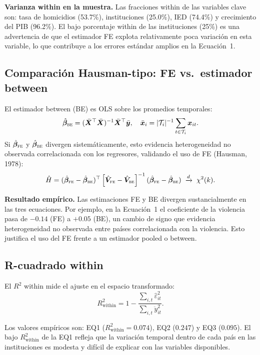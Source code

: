 \documentclass[12pt, a4paper]{article}
\theoremstyle{definition}
\begin{document}
\begin{resultbox}
\textbf{Varianza within en la muestra.} Las fracciones within de las variables clave son: tasa de homicidios (53.7\%), instituciones (25.0\%), IED (74.4\%) y crecimiento del PIB (96.2\%). El bajo porcentaje within de las instituciones (25\%) es una advertencia de que el estimador FE explota relativamente poca variación en esta variable, lo que contribuye a los errores estándar amplios en la Ecuación~1.
\end{resultbox}

\subsection{Comparación Hausman-tipo: FE vs.\ estimador between}

El estimador between (BE) es OLS sobre los promedios temporales:
\[
  \hat{\bm{\beta}}_{\textsc{be}} = (\bar{\bm{X}}^\top\bar{\bm{X}})^{-1}\bar{\bm{X}}^\top\bar{\bm{y}},
  \quad \bar{\bm{x}}_i = |\mathcal{T}_i|^{-1}\sum_{t\in\mathcal{T}_i}\bm{x}_{it}.
\]
Si $\hat{\bm{\beta}}_{\textsc{fe}}$ y $\hat{\bm{\beta}}_{\textsc{be}}$ divergen sistemáticamente, esto evidencia heterogeneidad no observada correlacionada con los regresores, validando el uso de FE (Hausman, 1978):
\[
  \hat{H} = (\hat{\bm{\beta}}_{\textsc{fe}} - \hat{\bm{\beta}}_{\textsc{be}})^\top
            \left[\hat{\bm{V}}_{\textsc{fe}} - \hat{\bm{V}}_{\textsc{be}}\right]^{-1}
            (\hat{\bm{\beta}}_{\textsc{fe}} - \hat{\bm{\beta}}_{\textsc{be}})
  \;\xrightarrow{d}\; \chi^2(k).
\]

\begin{resultbox}
\textbf{Resultado empírico.} Las estimaciones FE y BE divergen sustancialmente en las tres ecuaciones. Por ejemplo, en la Ecuación~1 el coeficiente de la violencia pasa de $-0.14$ (FE) a $+0.05$ (BE), un cambio de signo que evidencia heterogeneidad no observada entre países correlacionada con la violencia. Esto justifica el uso del FE frente a un estimador pooled o between.
\end{resultbox}

\subsection{R-cuadrado within}

El $R^2$ within mide el ajuste en el espacio transformado:
\[
  R^2_{\text{within}} = 1 - \frac{\sum_{i,t}\hat{\varepsilon}_{it}^2}{\sum_{i,t}\ddot{y}_{it}^2}.
\]

Los valores empíricos son: EQ1 ($R^2_{\text{within}} = 0.074$), EQ2 ($0.247$) y EQ3 ($0.095$). El bajo $R^2_{\text{within}}$ de la EQ1 refleja que la variación temporal dentro de cada país en las instituciones es modesta y difícil de explicar con las variables disponibles.
\end{document}
